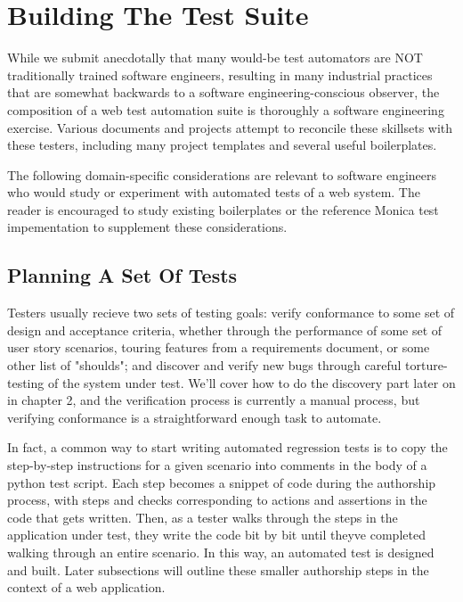 \section{Building The Test Suite}
While we submit anecdotally that many would-be test automators are NOT traditionally trained software engineers, resulting in many industrial practices that are somewhat backwards to a software engineering-conscious observer, the composition of a web test automation suite is thoroughly a software engineering exercise. Various documents and projects attempt to reconcile these skillsets with these testers, including many project templates and several useful boilerplates. \citep{GitHubma29}

The following domain-specific considerations are relevant to software engineers who would study or experiment with automated tests of a web system. The reader is encouraged to study existing boilerplates or the reference Monica test impementation to supplement these considerations.

\subsection{Planning A Set Of Tests}
Testers usually recieve two sets of testing goals: verify conformance to some set of design and acceptance criteria, whether through the performance of some set of user story scenarios, touring features from a requirements document, or some other list of "shoulds"; and discover and verify new bugs through careful torture-testing of the system under test. We'll cover how to do the discovery part later on in chapter 2, and the verification process is currently a manual process, but verifying conformance is a straightforward enough task to automate.

In fact, a common way to start writing automated regression tests is to copy the step-by-step instructions for a given scenario into comments in the body of a python test script. Each step becomes a snippet of code during the authorship process, with steps and checks corresponding to actions and assertions in the code that gets written. Then, as a tester walks through the steps in the application under test, they write the code bit by bit until theyve completed walking through an entire scenario. In this way, an automated test is designed and built.\citep{nguyen2001testing} Later subsections will outline these smaller authorship steps in the context of a web application.

